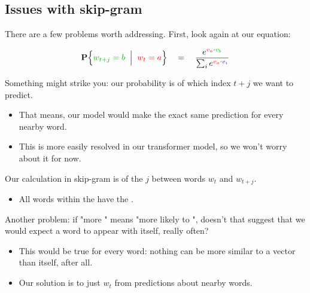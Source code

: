     



    \phantom{}

    \subsection{Issues with skip-gram}

        There are a few problems worth addressing. First, look again at our equation:

        \begin{equation*}
                \given{ \grn{w_{t+j} = b} }{ \red{w_t=a} } 
                \quad=\quad
                \frac{e^{\red{v_a} \cdot \grn{v_b}} }{ \sum_i e^{\red{v_a} \cdot \blu{v_i} }}
        \end{equation*}

        Something might strike you: our probability is  of which index $t+j$ we want to predict.

        \begin{itemize}
            \item That means, our model would make the exact same prediction for every nearby word.
            \item This is more easily resolved in our transformer model, so we won't worry about it for now.\\
        \end{itemize}

        \begin{concept}
            Our  calculation in skip-gram is  of the  $j$ between words $w_t$ and $w_{t+j}$.

            \begin{itemize}
                \item All words within the  have the .
            \end{itemize}
        \end{concept}

        \subsecdiv

        Another problem: if "more " means "more likely to ", doesn't that suggest that we would expect a word to appear with itself, really often?

        \begin{itemize}
            \item This would be true for every word: nothing can be more similar to a vector than itself, after all.

            \item Our solution is to just  $w_t$ from predictions about nearby words.\\
        \end{itemize}

